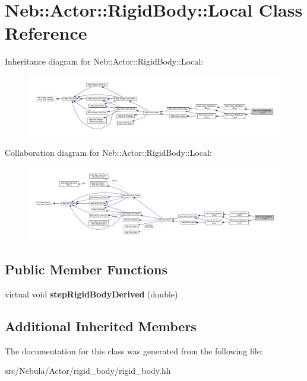 \hypertarget{classNeb_1_1Actor_1_1RigidBody_1_1Local}{\section{Neb\-:\-:Actor\-:\-:Rigid\-Body\-:\-:Local Class Reference}
\label{classNeb_1_1Actor_1_1RigidBody_1_1Local}
}


Inheritance diagram for Neb\-:\-:Actor\-:\-:Rigid\-Body\-:\-:Local\-:
\nopagebreak
\begin{figure}[H]
\begin{center}
\leavevmode
\includegraphics[width=350pt]{classNeb_1_1Actor_1_1RigidBody_1_1Local__inherit__graph}
\end{center}
\end{figure}


Collaboration diagram for Neb\-:\-:Actor\-:\-:Rigid\-Body\-:\-:Local\-:
\nopagebreak
\begin{figure}[H]
\begin{center}
\leavevmode
\includegraphics[width=350pt]{classNeb_1_1Actor_1_1RigidBody_1_1Local__coll__graph}
\end{center}
\end{figure}
\subsection*{Public Member Functions}
\begin{DoxyCompactItemize}
\item 
\hypertarget{classNeb_1_1Actor_1_1RigidBody_1_1Local_abe5e93b43eb6f75de255403a1e441d53}{virtual void {\bfseries step\-Rigid\-Body\-Derived} (double)}\label{classNeb_1_1Actor_1_1RigidBody_1_1Local_abe5e93b43eb6f75de255403a1e441d53}

\end{DoxyCompactItemize}
\subsection*{Additional Inherited Members}


The documentation for this class was generated from the following file\-:\begin{DoxyCompactItemize}
\item 
src/\-Nebula/\-Actor/rigid\-\_\-body/rigid\-\_\-body.\-hh\end{DoxyCompactItemize}
